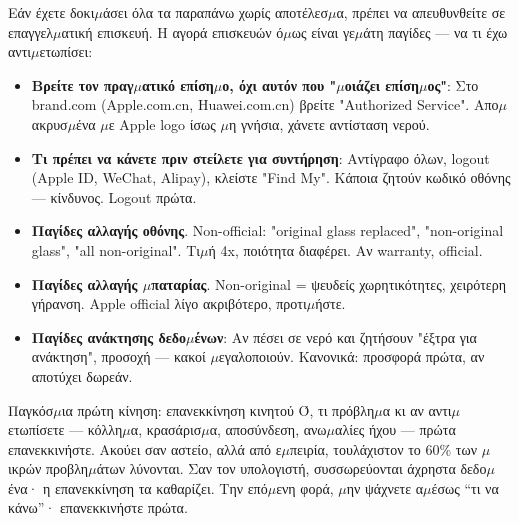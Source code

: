 
Εάν έχετε δοκι$\mu$άσει όλα τα παραπάνω χωρίς αποτέλεσ$\mu$α, πρέπει να απευθυνθείτε σε επαγγελ$\mu$ατική επισκευή. Η αγορά επισκευών ό$\mu$ως είναι γε$\mu$άτη παγίδες — να τι έχω αντι$\mu$ετωπίσει:

\begin{itemize}
  \item \textbf{Βρείτε τον πραγ$\mu$ατικό επίση$\mu$ο, όχι αυτόν που "$\mu$οιάζει επίση$\mu$ος"}: Στο brand.com (Apple.com.cn, Huawei.com.cn) βρείτε "Authorized Service". Απο$\mu$ακρυσ$\mu$ένα $\mu$ε Apple logo ίσως $\mu$η γνήσια, χάνετε αντίσταση νερού.
  \item \textbf{Τι πρέπει να κάνετε πριν στείλετε για συντήρηση}: Αντίγραφο όλων, logout (Apple ID, WeChat, Alipay), κλείστε "Find My". Κάποια ζητούν κωδικό οθόνης — κίνδυνος. Logout πρώτα.
  \item \textbf{Παγίδες αλλαγής οθόνης}. Non-official: "original glass replaced", "non-original glass", "all non-original". Τι$\mu$ή 4x, ποιότητα διαφέρει. Αν warranty, official.
  \item \textbf{Παγίδες αλλαγής $\mu$παταρίας}. Non-original = ψευδείς χωρητικότητες, χειρότερη γήρανση. Apple official λίγο ακριβότερο, προτι$\mu$ήστε.
  \item \textbf{Παγίδες ανάκτησης δεδο$\mu$ένων}: Αν πέσει σε νερό και ζητήσουν "έξτρα για ανάκτηση", προσοχή — κακοί $\mu$εγαλοποιούν. Κανονικά: προσφορά πρώτα, αν αποτύχει δωρεάν.
\end{itemize}

\begin{tcbwarn}{Παγκόσ$\mu$ια πρώτη κίνηση: επανεκκίνηση κινητού}
Ό, τι πρόβλη$\mu$α κι αν αντι$\mu$ετωπίσετε — κόλλη$\mu$α, κρασάρισ$\mu$α, αποσύνδεση, ανω$\mu$αλίες ήχου — πρώτα επανεκκινήστε. Ακούει σαν αστείο, αλλά από ε$\mu$πειρία, τουλάχιστον το 60\% των $\mu$ικρών προβλη$\mu$άτων λύνονται. Σαν τον υπολογιστή, συσσωρεύονται άχρηστα δεδο$\mu$ένα· η επανεκκίνηση τα καθαρίζει. Την επό$\mu$ενη φορά, $\mu$ην ψάχνετε α$\mu$έσως “τι να κάνω”· επανεκκινήστε πρώτα.

\end{tcbwarn}

